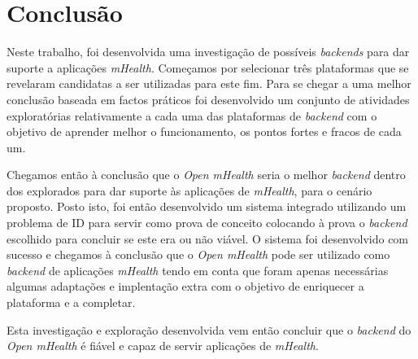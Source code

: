 \chapter{Conclusão}

Neste trabalho, foi desenvolvida uma investigação de possíveis \textit{backends} para dar suporte a aplicações \textit{mHealth}. 
Começamos por selecionar três plataformas que se revelaram candidatas a ser utilizadas para este fim. Para se chegar a uma melhor conclusão baseada em factos práticos foi desenvolvido um conjunto de atividades exploratórias relativamente a cada uma das plataformas de \textit{backend} com o objetivo de aprender melhor o funcionamento, os pontos fortes e fracos de cada um. \par 
Chegamos então à conclusão que o \textit{Open mHealth} seria o melhor \textit{backend} dentro dos explorados para dar suporte às aplicações de \textit{mHealth}, para o cenário proposto.
Posto isto, foi então desenvolvido um sistema integrado utilizando um problema de \gls{ID} para servir como prova de conceito colocando à prova o \textit{backend} escolhido para concluir se este era ou não viável.
O sistema foi desenvolvido com sucesso e chegamos à conclusão que o \textit{Open mHealth} pode ser utilizado como \textit{backend} de aplicações \textit{mHealth} tendo em conta que foram apenas necessárias algumas adaptações e implentação extra com o objetivo de enriquecer a plataforma e a completar. \par
Esta investigação e exploração desenvolvida vem então concluir que o \textit{backend} do \textit{Open mHealth} é fiável e capaz de servir aplicações de \textit{mHealth}.


